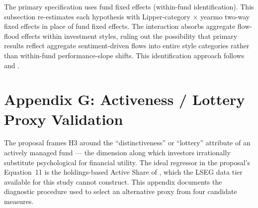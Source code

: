 \documentclass[12pt]{article}
\begin{document}
The primary specification uses fund fixed effects (within-fund
identification). This subsection re-estimates each hypothesis with
Lipper-category $\times$ yearmo two-way fixed effects in place of fund
fixed effects. The interaction absorbs aggregate flow-flood effects within
investment styles, ruling out the possibility that primary results reflect
aggregate sentiment-driven flows into entire style categories rather than
within-fund performance-slope shifts. This identification approach follows
\textcite{ChengEtal2025} and \textcite{BerkVanBinsbergen2015}.


\newpage

\newpage

\clearpage

\clearpage


\clearpage
\section*{Appendix G: Activeness / Lottery Proxy Validation}
\label{app:proxy_validation}
\setcounter{table}{0}
\renewcommand{\thetable}{G.\arabic{table}}

The proposal frames H3 around the ``distinctiveness'' or ``lottery''
attribute of an actively managed fund --- the dimension along which
investors irrationally substitute psychological for financial utility. The
ideal regressor in the proposal's Equation~11 is the holdings-based Active
Share of \textcite{CremersPetajisto2009}, which the LSEG data tier
available for this study cannot construct. This appendix documents the
diagnostic procedure used to select an alternative proxy from four
candidate measures.
\end{document}
